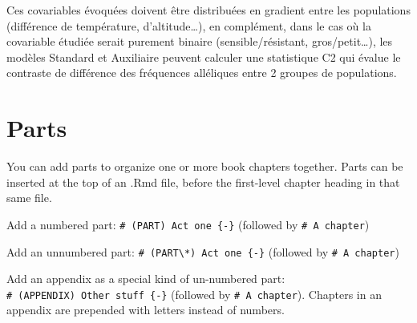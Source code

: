 \documentclass[
  openany]{book}
\theoremstyle{definition}
\theoremstyle{definition}
\theoremstyle{definition}
\theoremstyle{definition}
\theoremstyle{remark}
\begin{document}
Ces covariables évoquées doivent être distribuées en gradient entre les populations (différence de température, d'altitude\ldots), en complément, dans le cas où la covariable étudiée serait purement binaire (sensible/résistant, gros/petit\ldots), les modèles Standard et Auxiliaire peuvent calculer une statistique C2 qui évalue le contraste de différence des fréquences alléliques entre 2 groupes de populations.

\hypertarget{parts}{%
\chapter{Parts}\label{parts}}

You can add parts to organize one or more book chapters together. Parts can be inserted at the top of an .Rmd file, before the first-level chapter heading in that same file.

Add a numbered part: \texttt{\#\ (PART)\ Act\ one\ \{-\}} (followed by \texttt{\#\ A\ chapter})

Add an unnumbered part: \texttt{\#\ (PART\textbackslash{}*)\ Act\ one\ \{-\}} (followed by \texttt{\#\ A\ chapter})

Add an appendix as a special kind of un-numbered part: \texttt{\#\ (APPENDIX)\ Other\ stuff\ \{-\}} (followed by \texttt{\#\ A\ chapter}). Chapters in an appendix are prepended with letters instead of numbers.

  
\end{document}
